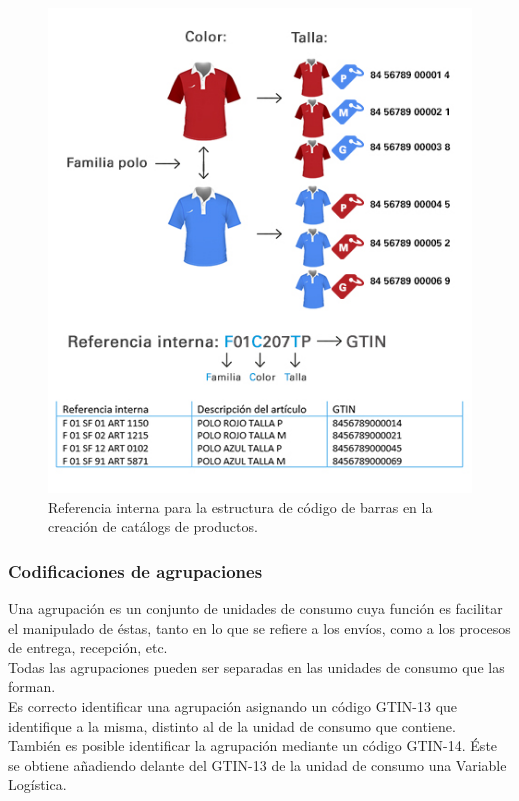 \begin{figure}
  \centering
    \includegraphics[scale=0.7]{./Capitulo2/figs/catalogo_post_barras.jpg}
  \caption{Referencia interna para la estructura de código de barras en la creación de catálogs de productos.}
  \label{catalogo_post_barras}
\end{figure}

\subsubsection{Codificaciones de agrupaciones}

Una agrupación es un conjunto de unidades de consumo cuya función es facilitar el manipulado de éstas, tanto en lo que se refiere a los envíos, como a los procesos de entrega, recepción, etc.\\

Todas las agrupaciones pueden ser separadas en las unidades de consumo que las forman.\\

Es correcto identificar una agrupación asignando un código GTIN-13 que identifique a la misma, distinto al de la unidad de consumo que contiene.\\

También es posible identificar la agrupación mediante un código GTIN-14. Éste se obtiene añadiendo delante del GTIN-13 de la unidad de consumo una Variable Logística.\

